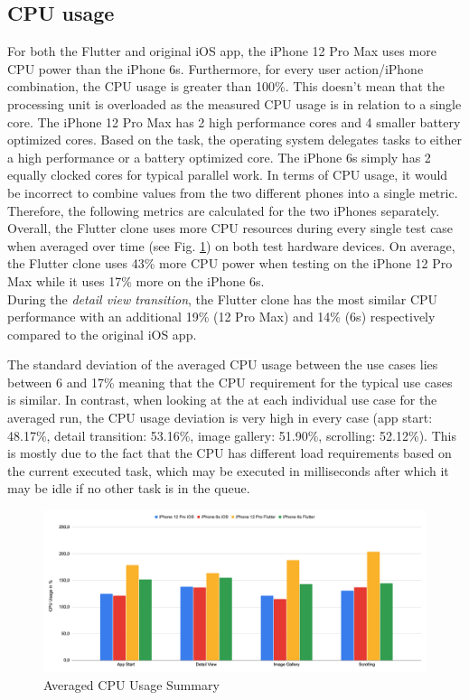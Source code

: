 \subsection{CPU usage} \label{section::cpu_usage}
For both the Flutter and original iOS app, the iPhone 12 Pro Max uses more CPU power than the iPhone 6s. Furthermore, for every user action/iPhone combination, the 
CPU usage is greater than 100\%. This doesn't mean that the processing unit is overloaded as the measured CPU usage is in relation to a single core.
The iPhone 12 Pro Max has 2 high performance cores and 4 smaller battery optimized cores. Based on the task, the operating system delegates tasks to either a high performance or a 
battery optimized core.
The iPhone 6s simply has 2 equally clocked cores for typical parallel work.
In terms of CPU usage, it would be incorrect to combine values from the two different phones into a single metric. Therefore, the following metrics are calculated for the two iPhones separately.\\
Overall, the Flutter clone uses more CPU resources during every single test case when averaged over time (see Fig. \ref{fig:avg_cpu_usage_summary}) on both test hardware devices.
On average, the Flutter clone uses 43\% more CPU power when testing on the iPhone 12 Pro Max while it uses 17\% more on the iPhone 6s.\\
During the \textit{detail view transition}, the Flutter clone has the most similar CPU performance with an additional 19\% (12 Pro Max) and 14\% (6s) respectively compared to the original iOS app.

The standard deviation of the averaged CPU usage between the use cases lies between 6 and 17\% meaning that the CPU requirement for the typical use cases is similar.
In contrast, when looking at the at each individual use case for the averaged run, the CPU usage deviation is very high in every case (app start: 48.17\%, detail transition: 53.16\%, image gallery: 51.90\%, scrolling: 52.12\%).
This is mostly due to the fact that the CPU has different load requirements based on the current executed task, which may be executed in milliseconds after which it may be idle if no other task is in the queue.

\begin{figure}[!h]
    \centering
    \includegraphics[width=\linewidth]{images/performance_results/summary_charts/avg_cpu_usage_summary.png}
    \caption{Averaged CPU Usage Summary}
    \label{fig:avg_cpu_usage_summary}
\end{figure}

